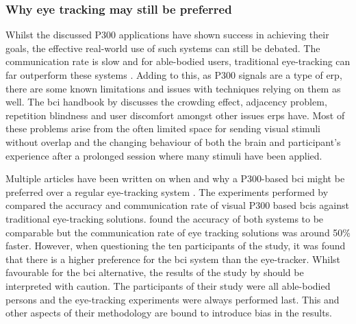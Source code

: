 
\subsubsection{Why eye tracking may still be preferred}
\label{subsubsec:bci_common_use_cases_bcis_replace_eye_tracking_eye_tracking_better}

Whilst the discussed P300 applications have shown success in achieving their goals, the effective real-world use of such systems can still be debated.
The communication rate is slow and for able-bodied users, traditional eye-tracking can far outperform these systems \citep{eye_tracking_vs_p300_comparable}.
Adding to this, as P300 signals are a type of \gls{erp}, there are some known limitations and issues with techniques relying on them as well.
The \gls{bci} handbook by \citet[Chapter~26]{bci_handbook} discusses the crowding effect, adjacency problem, repetition blindness and user discomfort amongst other issues \glspl{erp} have.
Most of these problems arise from the often limited space for sending visual stimuli without overlap and the changing behaviour of both the brain and participant's experience after a prolonged session where many stimuli have been applied.

Multiple articles have been written on when and why a P300-based \gls{bci} might be preferred over a regular eye-tracking system \citep{eye_tracking_vs_p300_comparable, p300_eyetracking_slower}.
The experiments performed by \citet{eye_tracking_vs_p300_comparable} compared the accuracy and communication rate of visual P300 based \glspl{bci} against traditional eye-tracking solutions.
 found the accuracy of both systems to be comparable but the communication rate of eye tracking solutions was around 50\% faster.
However, when questioning the ten participants of the study, it was found that there is a higher preference for the \gls{bci} system than the eye-tracker.
Whilst favourable for the \gls{bci} alternative, the results of the study by \citet{eye_tracking_vs_p300_comparable} should be interpreted with caution.
The participants of their study were all able-bodied persons and the eye-tracking experiments were always performed last.
This and other aspects of their methodology are bound to introduce bias in the results.

